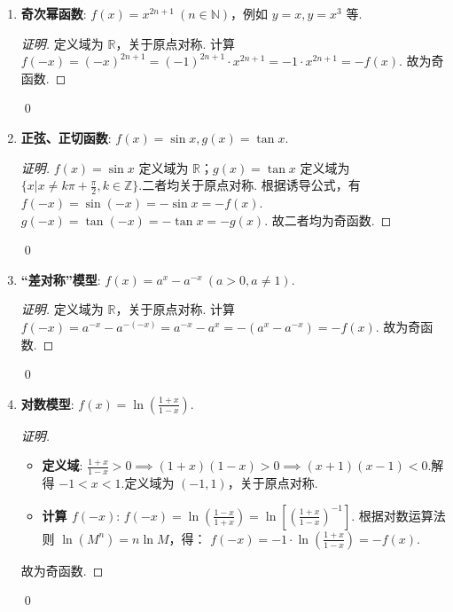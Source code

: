 \begin{enumerate}
	\item \textbf{奇次幂函数}: $f(x) = x^{2n+1} \ (n \in \mathbb{N})$，例如 $y=x, y=x^3$ 等.
	\begin{proof}[证明]
		定义域为 $\mathbb{R}$，关于原点对称.
		计算 $f(-x) = (-x)^{2n+1} = (-1)^{2n+1} \cdot x^{2n+1} = -1 \cdot x^{2n+1} = -f(x)$.
		故为奇函数.
	\end{proof}
	\qed
	
	\item \textbf{正弦、正切函数}: $f(x) = \sin x, g(x) = \tan x$.
	\begin{proof}[证明]
		$f(x)=\sin x$ 定义域为 $\mathbb{R}$；$g(x)=\tan x$ 定义域为 $\{x|x \neq k\pi + \frac{\pi}{2}, k \in \mathbb{Z}\}$.二者均关于原点对称.
		根据诱导公式，有 $f(-x) = \sin(-x) = -\sin x = -f(x)$.
		$g(-x) = \tan(-x) = -\tan x = -g(x)$.
		故二者均为奇函数.
	\end{proof}
	\qed
	
	\item \textbf{“差对称”模型}: $f(x) = a^x - a^{-x} \ (a>0, a\neq 1)$.
	\begin{proof}[证明]
		定义域为 $\mathbb{R}$，关于原点对称.
		计算 $f(-x) = a^{-x} - a^{-(-x)} = a^{-x} - a^x = -(a^x - a^{-x}) = -f(x)$.
		故为奇函数.
	\end{proof}
	\qed
	
	\item \textbf{对数模型}: $f(x) = \ln\left(\frac{1+x}{1-x}\right)$.
	\begin{proof}[证明]
		\begin{itemize}
			\item \textbf{定义域}: $\frac{1+x}{1-x} > 0 \implies (1+x)(1-x) > 0 \implies (x+1)(x-1)<0$.解得 $-1 < x < 1$.定义域为 $(-1,1)$，关于原点对称.
			\item \textbf{计算 $f(-x)$}:
			$f(-x) = \ln\left(\frac{1-x}{1+x}\right) = \ln\left[\left(\frac{1+x}{1-x}\right)^{-1}\right]$.
			根据对数运算法则 $\ln(M^n) = n \ln M$，得：
			$f(-x) = -1 \cdot \ln\left(\frac{1+x}{1-x}\right) = -f(x)$.
		\end{itemize}
		故为奇函数.
	\end{proof}
	\qed
\end{enumerate}

